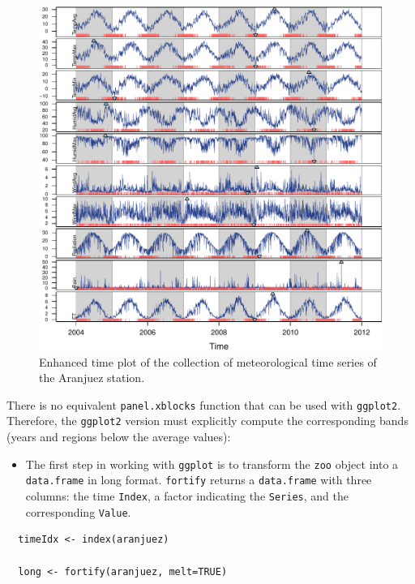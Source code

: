 \documentclass[smallroyalvopaper]{memoir}
\begin{document}
\begin{figure}[htbp]
\centering
\includegraphics[width=.9\linewidth]{figs/aranjuezXblocks.pdf}
\caption{Enhanced time plot of the collection of meteorological time series of the Aranjuez station. \label{fig:aranjuezEnhanced}}
\end{figure}

There is no equivalent \texttt{panel.xblocks} function that can be used with
\texttt{ggplot2}. Therefore, the \texttt{ggplot2} version must explicitly compute
the corresponding bands (years and regions below the average values):

\begin{itemize}
\item The first step in working with \texttt{ggplot} is to transform the \texttt{zoo}
object into a \texttt{data.frame} in long format. \texttt{fortify} returns a
\texttt{data.frame} with three columns: the time \texttt{Index}, a factor
indicating the \texttt{Series}, and the corresponding \texttt{Value}.
\end{itemize}
\lstset{language=r,label= ,caption= ,captionpos=b,numbers=none}
\begin{lstlisting}
  timeIdx <- index(aranjuez)
  
  long <- fortify(aranjuez, melt=TRUE)
\end{lstlisting}
\end{document}
